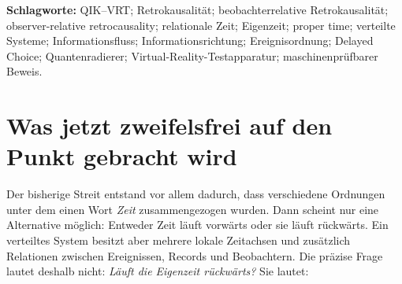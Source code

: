 \documentclass[11pt,a4paper]{article}
\theoremstyle{remark}
\newcommand{\recv}{\prec_{\!O}^{R}}
\newcommand{\sourceord}{\prec^{\theta}}
\begin{document}
\begin{otherlanguage}{english}
\begin{abstract}
This paper gives a precise definition and existence theorem for
observer-relative retrocausality in QIK--VRT. An observer advances monotonically
in proper time while authentic information records may arrive in an order
opposite to the source-event order bound by those records. Ordinally,
\(r^{+}\recv r^{-}\) although \(r^{-}\sourceord r^{+}\); metrically,
\(\Delta\tau_O>0\), \(\Delta\theta<0\), and hence \(v_I^O<0\). This negative
information-reference direction is what the present work calls
observer-relative retrocausality. The theorem is proved, reproduced by an
executable finite witness, and constructively realized with future-directed
signal paths of unequal latency. No reversal of proper time, past overwrite,
causal loop, or controllable signal into an observer's causal past is inferred.
Delayed-choice and quantum-eraser experiments instantiate the adjoining
physical structure in which later context makes a decision-sufficient
classification of earlier records available while leaving the earlier local
marginal unchanged. The universal correspondence of this structure to the
cosmos is stated separately as Ingolf Lohmann's QIK--VRT correspondence thesis.
\end{abstract}
\end{otherlanguage}

\textbf{Schlagworte:} QIK--VRT; Retrokausalität; beobachterrelative
Retrokausalität; observer-relative retrocausality; relationale Zeit;
Eigenzeit; proper time; verteilte Systeme; Informationsfluss;
Informationsrichtung; Ereignisordnung; Delayed Choice; Quantenradierer;
Virtual-Reality-Testapparatur; maschinenprüfbarer Beweis.

\clearpage
\begingroup
\setlength{\parskip}{0pt}
\small
\tableofcontents
\endgroup
\clearpage

\section{Was jetzt zweifelsfrei auf den Punkt gebracht wird}

Der bisherige Streit entstand vor allem dadurch, dass verschiedene Ordnungen
unter dem einen Wort \emph{Zeit} zusammengezogen wurden. Dann scheint nur eine
Alternative möglich: Entweder Zeit läuft vorwärts oder sie läuft rückwärts.
Ein verteiltes System besitzt aber mehrere lokale Zeitachsen und zusätzlich
Relationen zwischen Ereignissen, Records und Beobachtern. Die präzise Frage
lautet deshalb nicht: \emph{Läuft die Eigenzeit rückwärts?} Sie lautet:
\end{document}
